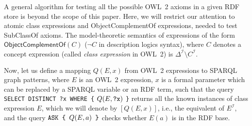 \documentclass{llncs}
\begin{document}

A general algorithm for testing all the possible OWL~2 axioms in a given RDF store is beyond the scope of this paper. 
Here, we will restrict our attention to atomic class expressions and \textsf{ObjectComplementOf}
expressions, needed to test \textsf{SubClassOf} axioms.
The model-theoretic semantics of expressions of the form $\mathsf{ObjectComplementOf}(C)$
($\neg C$ in description logics syntax), where $C$ denotes a concept expression
(called \emph{class expression} in OWL~2) is $\Delta^\mathcal{I} \setminus C^\mathcal{I}$.


Now, let us define a mapping $Q(E, x)$ from OWL~2 expressions to SPARQL graph patterns,
where $E$ is an OWL~2 expression, $x$ is a formal parameter which can be replaced by
a SPARQL variable or an RDF term,
such that the query
\texttt{SELECT DISTINCT ?x WHERE \{} $Q(E, \mbox{\tt ?x})$ \texttt{\}}
returns all the known instances of class expression $E$, which we will denote by
$[Q(E, x)]$, i.e., the equivalent of $E^\mathcal{I}$,
and the query $\mbox{\tt ASK \{ } Q(E, a) \mbox{\tt\ \}}$ checks whether $E(a)$
is in the RDF base.
\end{document}
